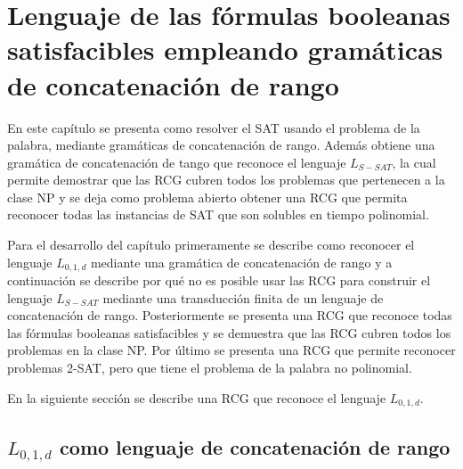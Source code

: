 


\chapter{Lenguaje de las fórmulas booleanas satisfacibles empleando gramáticas de concatenación de rango}
\label{chap:LSATRCG}

En este capítulo se presenta como resolver el SAT usando el problema de la palabra, mediante gramáticas de concatenación
de rango. Además obtiene una gramática de concatenación de tango que reconoce el lenguaje $L_{S-SAT}$, la cual permite demostrar
que las RCG cubren todos los problemas que pertenecen a la clase NP y se deja como problema abierto
obtener una RCG que permita reconocer todas las instancias de SAT que son solubles en tiempo polinomial.

Para el desarrollo del capítulo primeramente se describe como reconocer el lenguaje $L_{0,1,d}$ mediante una gramática de concatenación 
de rango y a continuación se describe por qué no es posible usar las RCG para construir el lenguaje 
$L_{S-SAT}$ mediante una transducción finita de un lenguaje de concatenación de rango.  Posteriormente 
se presenta una RCG que reconoce todas las fórmulas booleanas satisfacibles y se demuestra que las RCG 
cubren todos los problemas en la clase NP. Por último se presenta una RCG que permite reconocer problemas 
2-SAT, pero que tiene el problema de la palabra no polinomial.

En la siguiente sección se describe una RCG que reconoce el lenguaje $L_{0,1,d}$.

\section{$L_{0,1,d}$ como lenguaje de concatenación de rango}

